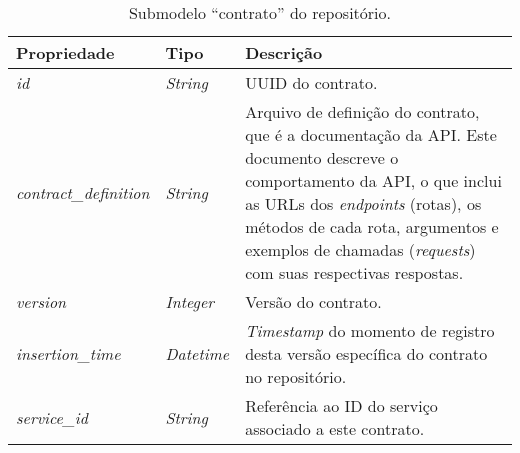 \begin{table}[htb]
	\centering
	\caption{Submodelo ``contrato'' do repositório.}
	\begin{tabular}{p{3.5cm}p{1.5cm}p{9cm}}
		\hline
		\textbf{Propriedade}
		 & \textbf{Tipo}
		 & \textbf{Descrição}                                                                                                                                                                                                                                                                 \\

		\hline
		\textit{id}
		 & \textit{String}
		 & UUID do contrato.                                                                                                                                                                                                                                                                  \\


		\hline
		\textit{contract\_definition}
		 & \textit{String}
		 & Arquivo de definição do contrato, que é a documentação da API. Este documento descreve o comportamento da API, o que inclui as URLs dos \textit{endpoints} (rotas), os métodos de cada rota, argumentos e exemplos de chamadas (\textit{requests}) com suas respectivas respostas. \\

		\hline
		\textit{version}
		 & \textit{Integer}
		 & Versão do contrato.                                                                                                                                                                                                                                                                \\

		\hline
		\textit{insertion\_time}
		 & \textit{Datetime}
		 & \textit{Timestamp} do momento de registro desta versão específica do contrato no repositório.                                                                                                                                                                                      \\

		\hline
		\textit{service\_id}
		 & \textit{String}
		 & Referência ao ID do serviço associado a este contrato.                                                                                                                                                                                                                             \\


		\hline
	\end{tabular}
	\label{tab:repositorio-submodelo-contrato}
\end{table}

